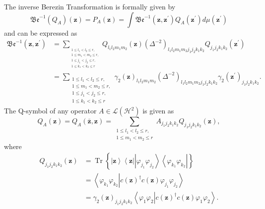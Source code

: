 \documentclass[aps,preprint]{revtex4}%
\begin{document}
The inverse Berezin Transformation is formally given by
\begin{equation}
\mathfrak{Be}^{-1}\left(  Q_{A}\right)  \left(  \mathbf{z}\right)
=P_{A}\left(  \mathbf{z}\right)  =\int\mathfrak{Be}^{-1}\left(  \mathbf{z,z}%
^{\prime}\right)  Q_{A}\left(  \mathbf{z}^{\prime}\right)  d\mu\left(
\mathbf{z}^{\prime}\right)
\end{equation}
and can be expressed as \cite{Weiner}%
\begin{align}
\mathfrak{Be}^{-1}\left(  \mathbf{z,z}^{\prime}\right)   &  =\sum
_{_{\substack{1\leq l_{1}<l_{2}\leq r,\\1\leq m_{1}<m_{2}\leq r,\\1\leq
j_{1}<j_{2}\leq r,\\1\leq k_{1}<k_{2}\leq r}}}Q_{l_{1}l_{2}m_{1}m_{2}}\left(
\mathbf{z}\right)  \left(  \Delta^{-2}\right)  _{l_{1}l_{2}m_{1}m_{2}%
j_{1}j_{2}k_{1}k_{2}}Q_{j_{1}j_{2}k_{1}k_{2}}\left(  \mathbf{z}^{\prime
}\right) \nonumber\\
&  =\sum_{\substack{1\leq l_{1}<l_{2}\leq r,\\1\leq m_{1}<m_{2}\leq r,\\1\leq
j_{1}<j_{2}\leq r,\\1\leq k_{1}<k_{2}\leq r}}\gamma_{2}\left(  \mathbf{z}%
\right)  _{l_{1}l_{2}m_{1}m_{2}}\left(  \Delta^{-2}\right)  _{l_{1}l_{2}%
m_{1}m_{2}j_{1}j_{2}k_{1}k_{2}}\gamma_{2}\left(  \mathbf{z}^{\prime}\right)
_{j_{1}j_{2}k_{1}k_{2}}.
\end{align}
The Q-symbol of any operator $A\in\mathcal{L}\left(  \mathcal{H}^{2}\right)  $
is given as
\begin{equation}
Q_{A}\left(  \mathbf{z}\right)  =Q_{A}\left(  \mathbf{\bar{z},z}\right)
=\sum_{\substack{1\leq l_{1}<l_{2}\leq r,\\1\leq m_{1}<m_{2}\leq r}%
}A_{j_{1}j_{2}k_{1}k_{2}}Q_{j_{1}j_{2}k_{1}k_{2}}\left(  \mathbf{z}\right)  ,
\end{equation}
where
\begin{align}
Q_{j_{1}j_{2}k_{1}k_{2}}\left(  \mathbf{z}\right)   &  =\operatorname*{Tr}%
\left\{  \left\vert \mathbf{z}\right\rangle \left\langle \mathbf{z}\right\vert
\left\vert \varphi_{j_{1}}\varphi_{j_{2}}\right\rangle \left\langle
\varphi_{k_{1}}\varphi_{k_{2}}\right\vert \right\} \nonumber\\
&  =\left\langle \varphi_{k_{1}}\varphi_{k_{2}}\left\vert c\left(
\mathbf{z}\right)  ^{\dagger}c\left(  \mathbf{z}\right)  \varphi_{j_{1}%
}\varphi_{j_{2}}\right.  \right\rangle \nonumber\\
&  =\gamma_{2}\left(  \mathbf{z}\right)  _{j_{1}j_{2}k_{1}k_{2}}\left\langle
\varphi_{1}\varphi_{2}\left\vert c\left(  \mathbf{z}\right)  ^{\dagger
}c\left(  \mathbf{z}\right)  \varphi_{1}\varphi_{2}\right.  \right\rangle .
\end{align}
\end{document}
